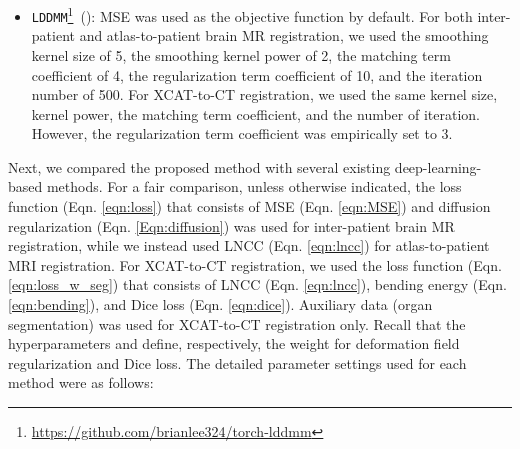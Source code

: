 \documentclass[times,twocolumn,final]{elsarticle}
\begin{document}
\begin{itemize}[noitemsep]
    \item \texttt{LDDMM}\footnote{\url{https://github.com/brianlee324/torch-lddmm}}~(\cite{beg2005computing}): MSE was used as the objective function by default. For both inter-patient and atlas-to-patient brain MR registration, we used the smoothing kernel size of 5, the smoothing kernel power of 2, the matching term coefficient of 4, the regularization term coefficient of 10, and the iteration number of 500. For XCAT-to-CT registration, we used the same kernel size, kernel power, the matching term coefficient, and the number of iteration. However, the regularization term coefficient was empirically set to 3.
\end{itemize}

Next, we compared the proposed method with several existing deep-learning-based methods. For a fair comparison, unless otherwise indicated, the loss function (Eqn. \ref{eqn:loss}) that consists of MSE (Eqn. \ref{eqn:MSE}) and diffusion regularization (Eqn. \ref{Eqn:diffusion}) was used for inter-patient brain MR registration, while we instead used LNCC (Eqn. \ref{eqn:lncc}) for atlas-to-patient MRI registration. For XCAT-to-CT registration, we used the loss function (Eqn. \ref{eqn:loss_w_seg}) that consists of LNCC (Eqn. \ref{eqn:lncc}), bending energy (Eqn. \ref{eqn:bending}), and Dice loss (Eqn. \ref{eqn:dice}). Auxiliary data (organ segmentation) was used for XCAT-to-CT registration only. Recall that the hyperparameters  and  define, respectively, the weight for deformation field regularization and Dice loss. The detailed parameter settings used for each method were as follows: 
\end{document}

